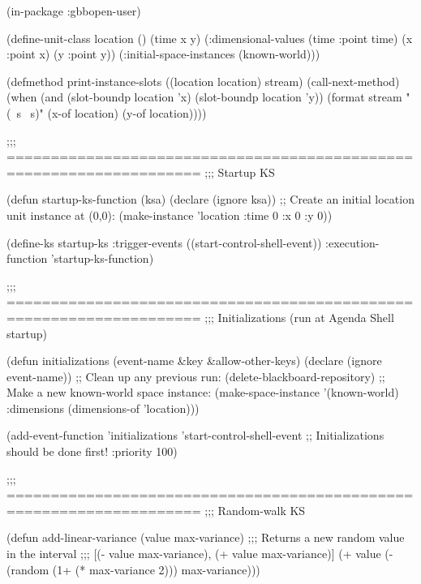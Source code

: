 \documentclass[10pt,twoside,english,pdftex]{article}
\begin{document}
\begin{example}
\W\supp
  (in-package :gbbopen-user)

  (define-unit-class location ()
    (time 
     x y)
    (:dimensional-values
      (time :point time)
      (x :point x)
      (y :point y))
    (:initial-space-instances (known-world)))

  (defmethod print-instance-slots ((location location) stream)
    (call-next-method)
    (when (and (slot-boundp location 'x)
               (slot-boundp location 'y))
      (format stream " (~s ~s)"
              (x-of location)
              (y-of location))))

  ;;; ====================================================================
  ;;;   Startup KS

  (defun startup-ks-function (ksa)
    (declare (ignore ksa))
    ;; Create an initial location unit instance at (0,0):
    (make-instance 'location :time 0 :x 0 :y 0))

  (define-ks startup-ks
      :trigger-events ((start-control-shell-event))
      :execution-function 'startup-ks-function)

  ;;; ====================================================================
  ;;;   Initializations (run at Agenda Shell startup)

  (defun initializations (event-name &key &allow-other-keys)
    (declare (ignore event-name))
    ;; Clean up any previous run:
    (delete-blackboard-repository)
    ;; Make a new known-world space instance:
    (make-space-instance 
     '(known-world)
     :dimensions (dimensions-of 'location)))

  (add-event-function 'initializations 'start-control-shell-event
                      ;; Initializations should be done first!
                      :priority 100)

  ;;; ====================================================================
  ;;;   Random-walk KS

  (defun add-linear-variance (value max-variance)
    ;;; Returns a new random value in the interval
    ;;; [(- value max-variance), (+ value max-variance)]
    (+ value (- (random (1+ (* max-variance 2))) max-variance)))


\end{example}
\end{document}
